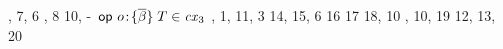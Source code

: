 \begin{bycase}
\begin{derivatioN}{5}
     {, 7, 6}
     {, 8}
     {10, \hyp\ $\mathsf{op}\ o\!:\!\{\overline{\beta}\}\;T\in\mathit{cx}_3$}
     {\Reop, 1, 11, 3}
\step{\op{\onam}{\tsbslash{\typS}{\tvarIS}{\typIS}}=
      \tsbslash{\opO}{\tvarIS}{\typIS}}
     {}
     {14, }
     {15, 6}
     {16}
     {17}
     {18, 10}
\step{\tsbslash{\tsbslash{\typ}{\tvarS}{\typS}}{\tvarIS}{\typIS}=
      \tsbslash{\tsbslash{\typ}{\tvarIS}{\typIS}}
               {\tvarS}{\tsbslash{\typS}{\tvarIS}{\typIS}}}
     {, 10, 19}
     {12, 13, 20}
\end{derivatioN}


\end{bycase}
